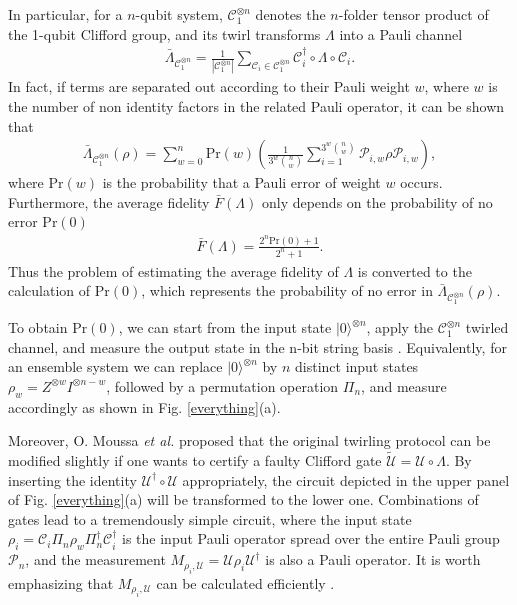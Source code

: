 \documentclass[prl,twocolumn,showpacs]{revtex4-1}
\newcommand{\ket}[1]{|#1\rangle}
\begin{document}
In particular, for a $n$-qubit system, $\mathcal{C}_1^{\otimes n}$ denotes the $n$-folder tensor product of the 1-qubit Clifford group, and its twirl transforms $\Lambda$ into a Pauli channel
\begin{align} \label{C1_twirl}
\bar{\Lambda}_{\mathcal{C}_1^{\otimes n}} = \frac{1}{|\mathcal{C}_1^{\otimes n}|}\sum_{\mathcal{C}_i\in \mathcal{C}_1^{\otimes n}} \mathcal{C}_i^{\dagger} \circ \Lambda \circ \mathcal{C}_i.
\end{align}
In fact, if terms are separated out according to their Pauli weight $w$, where $w$ is the number of non identity factors in the related Pauli operator, it can be shown that \cite{Silva2008}
\begin{align} \label{C1_twirlrho}
\bar{\Lambda}_{\mathcal{C}_1^{\otimes n}}(\rho) = \sum_{w=0}^n \text{Pr}(w) \left ( \frac{1}{3^w \binom{n}{w}} \sum_{i=1}^{3^w \binom{n}{w}} \mathcal{P}_{i,w} \rho \mathcal{P}_{i,w} \right ),
\end{align}
where $\text{Pr}(w)$ is the probability that a Pauli error of weight $w$ occurs. Furthermore, the average fidelity $\bar{F}(\Lambda)$ only depends on the probability of no error $\text{Pr}(0)$
\begin{align} \label{fidelity_pr}
\bar{F}(\Lambda) = \frac{2^n \text{Pr}(0) +1}{2^n +1}.
\end{align}
Thus the problem of estimating the average fidelity of $\Lambda$ is converted to the calculation of $\text{Pr}(0)$, which represents the probability of no error in $\bar{\Lambda}_{\mathcal{C}_1^{\otimes n}}(\rho)$.

To obtain $\text{Pr}(0)$, we can start from the input state $\ket{0}^{\otimes n}$, apply the $\mathcal{C}_1^{\otimes n}$ twirled channel, and measure the output state in the n-bit string basis \cite{Emerson2007}.  Equivalently, for an ensemble system we can replace $\ket{0}^{\otimes n}$ by $n$ distinct input states $\rho_w = Z^{\otimes w}I^{\otimes n-w}$, followed by a permutation operation $\Pi_n$, and measure accordingly as shown in Fig. \ref{everything}(a).

Moreover, O. Moussa \emph{et al.} proposed that \cite{Moussa2012} the original twirling protocol can be modified slightly if one wants to certify a faulty Clifford gate $\tilde{\mathcal{U}} = \mathcal{U} \circ \Lambda$. By inserting the identity $\mathcal{U}^{\dagger} \circ \mathcal{U}$ appropriately, the circuit depicted in the upper panel of Fig. \ref{everything}(a) will be transformed to the lower one.  Combinations of gates lead to a tremendously simple circuit, where the input state $\rho_{i} = \mathcal{C}_i \Pi_n \rho_{w} \Pi_n^{\dagger} \mathcal{C}_i^{\dagger}$ is the input Pauli operator spread over the entire Pauli group $\mathcal{P}_n$, and the measurement $M_{\rho_i, \mathcal{U}} = \mathcal{U} \rho_{i} \mathcal{U}^{\dagger}$ is also a Pauli operator. It is worth emphasizing that $M_{\rho_i, \mathcal{U}}$ can be calculated efficiently \cite{Aaronson2004}.
\end{document}
